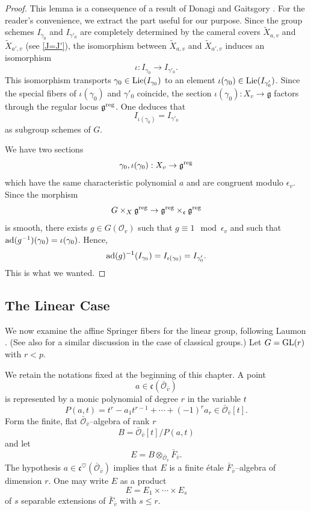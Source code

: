 \documentclass[12pt,english]{smfart}
\numberwithin{equation}{subsection}
\theoremstyle{remark}
\newcommand\calO{{\mathscr O}}
\newcommand\frakg{{\mathfrak g}}
\newcommand\frakc{{\mathfrak c}}
\newcommand\GL{{\rm GL}}
\newcommand\ad{{\rm ad}}
\newcommand\reg{{\rm reg}}
\begin{document}
\begin{proof}
This lemma is a consequence of a result of Donagi and Gaitsgory \cite[Theorem 11.8]{DG}. For the reader's convenience, we extract the part useful for our purpose. Since the group schemes $I_{\gamma_0}$ and $I_{\gamma'_0}$ are completely determined by the cameral covers $\widetilde X_{a,v}$ and $\widetilde X_{a',v}$ (see \ref{J=J'}), the isomorphism between $\widetilde X_{a,v}$ and $\widetilde X_{a',v}$ induces an isomorphism
$$\iota: I_{\gamma_0}\to I_{\gamma'_0}.$$ 
This isomorphism transports $\gamma_0\in {\rm Lie}(I_{\gamma_0})$ to an element $\iota(\gamma_0)\in {\rm Lie}(I_{\gamma'_0})$. Since the special fibers of $\iota(\gamma_0)$ and $\gamma'_0$ coincide, the section $\iota(\gamma_0):X_v\to\frakg$ factors through the regular locus $\frakg^\reg$. One deduces that
$$
I_{\iota(\gamma_0)}=I_{\gamma'_0}
$$
as subgroup schemes of $G$.

We have two sections
$$
\gamma_0, \iota(\gamma_0): X_v\to \frakg^\reg
$$
which have the same characteristic polynomial $a$ and are congruent modulo $\epsilon_v$. Since the morphism
$$
G\times_X \frakg^\reg \to \frakg^\reg\times_{\frakc}\frakg^\reg
$$
is smooth, there exists $g\in G(\calO_v)$ such that $g\equiv 1 \mod \epsilon_v$ and such that $\ad(g^{-1})(\gamma_0)=\iota(\gamma_0)$. Hence,
$$
\ad(g)^{-1}(I_{\gamma_0})= I_{\iota(\gamma_0)}=I_{\gamma'_0}.
$$
This is what we wanted.
\end{proof}

\subsection{The Linear Case}
\label{Cas lineaire local}

We now examine the affine Springer fibers for the linear group, following Laumon \cite{L}. (See also \cite{compagnon} for a similar discussion in the case of classical groups.) %
Let $G=\GL(r)$ with $r<p$.

We retain the notations fixed at the beginning of this chapter. A point
$$
a\in\frakc(\bar{\calO}_{\bar v})
$$
is represented by a monic polynomial of degree $r$ in the variable $t$
$$
P(a,t)=t^r-a_1t^{r-1}+\cdots+(-1)^r a_r\in \bar{\calO}_{\bar v}[t].
$$
Form the finite, flat $\bar{\calO}_{\bar v}$--algebra of rank $r$
$$
B=\bar{\calO}_{\bar v}[t]/P(a,t)
$$
and let
$$
E=B\otimes_{\bar{\calO}_{\bar v}} \bar{F}_{\bar v}.
$$
The hypothesis $a\in\frakc^\heartsuit(\bar{\calO}_{\bar v})$ implies that $E$ is a finite \'etale $\bar{F}_{\bar v}$--algebra of dimension $r$. One may write $E$ as a product
$$
E=E_1\times\cdots\times E_s
$$
of $s$ separable extensions of $\bar{F}_{\bar v}$ with $s\le r$.
\end{document}
